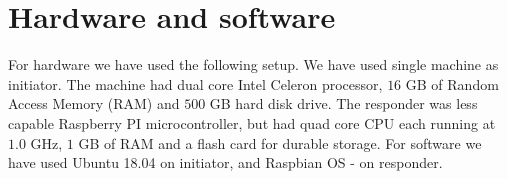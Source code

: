 \section{Hardware and software}
\label{sec:hardware}

For hardware we have used the following setup. We have used single 
machine as initiator. The machine had dual core Intel Celeron 
processor, $16$ GB of Random Access Memory (RAM) and $500$ GB
hard disk drive. The responder was less capable Raspberry PI 
microcontroller, but had quad core CPU each running at $1.0$ GHz, 
$1$ GB of RAM and a flash card for durable storage. For software 
we have used Ubuntu 18.04 on initiator, and Raspbian OS - on responder.